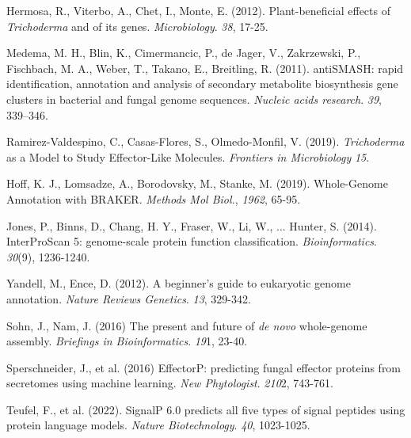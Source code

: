 \documentclass[12pt]{article}
\begin{document}
\begin{thebibliography}{99}
 Hermosa, R., Viterbo, A., Chet, I., Monte,
  E. (2012). Plant-beneficial effects of \textit{Trichoderma} and of
  its genes. \textit{Microbiology}. \textit{38},
  17-25. 

 Medema, M. H., Blin, K., Cimermancic, P., de
  Jager, V., Zakrzewski, P., Fischbach, M. A., Weber, T., Takano, E.,
  Breitling, R. (2011). antiSMASH: rapid identification, annotation
  and analysis of secondary metabolite biosynthesis gene clusters in
  bacterial and fungal genome sequences. \textit{Nucleic acids
    research}. \textit{39}, 339–346.

 Ramirez-Valdespino, C., Casas-Flores, S.,
  Olmedo-Monfil, V. (2019). \textit{Trichoderma} as a Model to Study
  Effector-Like Molecules. \textit{Frontiers in Microbiology} \textit{15}.

 Hoff, K. J., Lomsadze, A., Borodovsky, M., 
  Stanke, M. (2019). Whole-Genome Annotation with
  BRAKER. \textit{Methods Mol Biol.}, \textit{1962}, 65-95.

 Jones, P., Binns, D., Chang, H. Y., Fraser,
  W., Li, W., ... Hunter, S. (2014). InterProScan 5: genome-scale
  protein function
  classification. \textit{Bioinformatics}. \textit{30}(9),
  1236-1240.

 Yandell, M., Ence, D. (2012). A beginner's
  guide to eukaryotic genome annotation. \textit{Nature Reviews
    Genetics}. \textit{13}, 329-342.
  
 Sohn, J., Nam, J. (2016) The present and future of
  \textit{de novo} whole-genome assembly. \textit{Briefings in
    Bioinformatics}. \textit{19}1, 23-40.

 Sperschneider, J., et al. (2016) EffectorP:
  predicting fungal effector proteins from secretomes using machine
  learning. \textit{New Phytologist}. \textit{210}2, 743-761.

 Teufel, F., et al. (2022). SignalP 6.0 predicts all
  five types of signal peptides using protein language
  models. \textit{Nature Biotechnology}. \textit{40}, 1023-1025.
  
\end{thebibliography}
\end{document}
